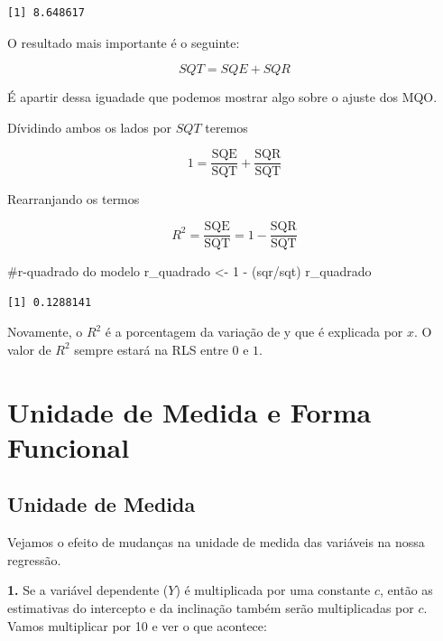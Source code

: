 \documentclass[
  letterpaper,
  DIV=11,
  numbers=noendperiod]{scrreprt}
\newenvironment{Shaded}{\begin{snugshade}}{\end{snugshade}}
\newcommand{\CommentTok}[1]{\textcolor[rgb]{0.37,0.37,0.37}{#1}}
\newcommand{\DecValTok}[1]{\textcolor[rgb]{0.68,0.00,0.00}{#1}}
\newcommand{\NormalTok}[1]{\textcolor[rgb]{0.00,0.23,0.31}{#1}}
\newcommand{\OtherTok}[1]{\textcolor[rgb]{0.00,0.23,0.31}{#1}}
\newcommand{\SpecialCharTok}[1]{\textcolor[rgb]{0.37,0.37,0.37}{#1}}
\begin{document}
\begin{verbatim}
[1] 8.648617
\end{verbatim}

O resultado mais importante é o seguinte:

\[SQT =  SQE + SQR\]

É apartir dessa iguadade que podemos mostrar algo sobre o ajuste dos
MQO.

Dívidindo ambos os lados por \(SQT\) teremos

\[1 = \frac{\text{SQE}}{\text{SQT}}  + \frac{\text{SQR}}{\text{SQT}}\]

Rearranjando os termos

\[R^2 = \frac{\text{SQE}}{\text{SQT}} = 1 - \frac{\text{SQR}}{\text{SQT}}\]

\begin{Shaded}
\begin{Highlighting}[]
\CommentTok{\#r{-}quadrado do modelo}
\NormalTok{r\_quadrado }\OtherTok{\textless{}{-}} \DecValTok{1} \SpecialCharTok{{-}}\NormalTok{ (sqr}\SpecialCharTok{/}\NormalTok{sqt)}
\NormalTok{r\_quadrado}
\end{Highlighting}
\end{Shaded}

\begin{verbatim}
[1] 0.1288141
\end{verbatim}

Novamente, o \(R^2\) é a porcentagem da variação de y que é explicada
por \(x\). O valor de \(R^2\) sempre estará na RLS entre \(0\) e \(1\).

\section{Unidade de Medida e Forma
Funcional}\label{unidade-de-medida-e-forma-funcional}

\subsection{Unidade de Medida}\label{unidade-de-medida}

Vejamos o efeito de mudanças na unidade de medida das variáveis na nossa
regressão.

\textbf{1.} Se a variável dependente (\(Y\)) é multiplicada por uma
constante \(c\), então as estimativas do intercepto e da inclinação
também serão multiplicadas por \(c\). Vamos multiplicar por 10 e ver o
que acontece:
\end{document}
